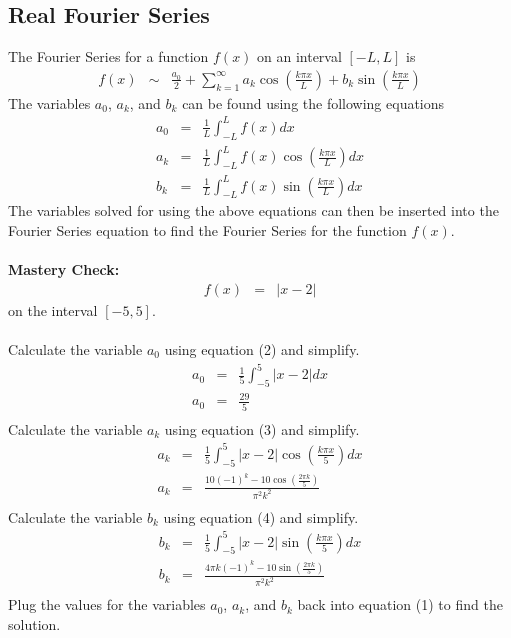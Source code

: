 \documentclass{article}
\newcommand{\bea}{\begin{eqnarray*}}
\newcommand{\eea}{\end{eqnarray*}}
\begin{document}
\subsection{Real Fourier Series}
The Fourier Series for a function $f(x)$ on an interval $[-L,L]$ is
\begin{eqnarray}
f(x) &\sim& \frac{a_0}{2} + \sum_{k=1}^{\infty}{a_k\cos\left(\frac{k\pi x}{L}\right)+b_k\sin\left(\frac{k\pi x}{L}\right)}
\end{eqnarray}
The variables $a_0$, $a_k$, and $b_k$ can be found using the following equations
\begin{eqnarray}
a_0 &=& \frac{1}{L}\int_{-L}^{L}{f(x)}dx\\
a_k &=& \frac{1}{L}\int_{-L}^{L}{f(x)\cos\left(\frac{k\pi x}{L}\right)}dx\\
b_k &=& \frac{1}{L}\int_{-L}^{L}{f(x)\sin\left(\frac{k\pi x}{L}\right)}dx
\end{eqnarray}
The variables solved for using the above equations can then be inserted into the Fourier Series equation to find the Fourier Series for the function $f(x)$.\\\\
\textbf{Mastery Check:}\\
\bea
f(x) &=& |x-2|
\eea
on the interval $[-5,5]$.\\\\
Calculate the variable $a_0$ using equation (2) and simplify.
\bea
a_0 &=& \frac{1}{5}\int_{-5}^{5}{|x-2|}dx\\
a_0 &=& \frac{29}{5}\\
\eea
Calculate the variable $a_k$ using equation (3) and simplify.
\bea
a_k &=& \frac{1}{5}\int_{-5}^{5}{|x-2|\cos\left(\frac{k\pi x}{5}\right)}dx\\
a_k &=& \frac{10(-1)^k-10\cos\left(\frac{2\pi k}{5}\right)}{\pi^2k^2}\\
\eea
Calculate the variable $b_k$ using equation (4) and simplify.
\bea
b_k &=& \frac{1}{5}\int_{-5}^{5}{|x-2|\sin\left(\frac{k\pi x}{5}\right)}dx\\
b_k &=& \frac{4\pi k(-1)^k-10\sin\left(\frac{2\pi k}{5}\right)}{\pi^2k^2}\\
\eea
Plug the values for the variables $a_0$, $a_k$, and $b_k$ back into equation (1) to find the solution.
\begin{center}\end{center}
\end{document}
